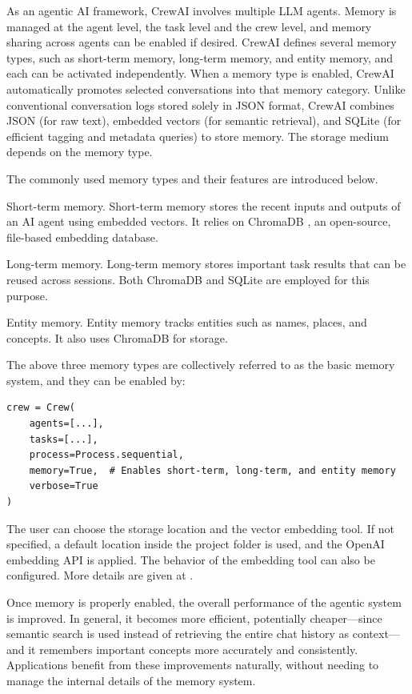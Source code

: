 As an agentic AI framework, CrewAI involves multiple LLM agents. Memory is managed at the agent level, the task level and the crew level, and memory sharing across agents can be enabled if desired. CrewAI defines several memory types, such as short-term memory, long-term memory, and entity memory, and each can be activated independently. When a memory type is enabled, CrewAI automatically promotes selected conversations into that memory category. Unlike conventional conversation logs stored solely in JSON format, CrewAI combines JSON (for raw text), embedded vectors (for semantic retrieval), and SQLite (for efficient tagging and metadata queries) to store memory. The storage medium depends on the memory type.

The commonly used memory types and their features are introduced below.

Short-term memory. Short-term memory stores the recent inputs and outputs of an AI agent using embedded vectors. It relies on ChromaDB \cite{chroma2025chroma}, an open-source, file-based embedding database.

Long-term memory. Long-term memory stores important task results that can be reused across sessions. Both ChromaDB and SQLite are employed for this purpose.

Entity memory. Entity memory tracks entities such as names, places, and concepts. It also uses ChromaDB for storage.

The above three memory types are collectively referred to as the basic memory system, and they can be enabled by:
\begin{lstlisting}
crew = Crew(
    agents=[...],
    tasks=[...],
    process=Process.sequential,
    memory=True,  # Enables short-term, long-term, and entity memory
    verbose=True
)
\end{lstlisting}

The user can choose the storage location and the vector embedding tool. If not specified, a default location inside the project folder is used, and the OpenAI embedding API is applied. The behavior of the embedding tool can also be configured. More details are given at \cite{crewai2025memory}.

Once memory is properly enabled, the overall performance of the agentic system is improved. In general, it becomes more efficient, potentially cheaper—since semantic search is used instead of retrieving the entire chat history as context—and it remembers important concepts more accurately and consistently. Applications benefit from these improvements naturally, without needing to manage the internal details of the memory system.


